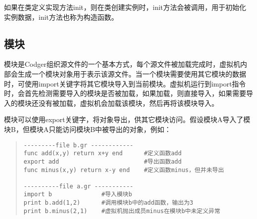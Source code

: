 如果在类定义实现方法init，则在类创建实例时，init方法会被调用，用于初始化实例数据，init方法也称为构造函数。

\subsection{模块} 
模块是Codger组织源文件的一个基本方式，每个源文件被加载完成时，虚拟机内部会生成一个模块对象用于表示该源文件。当一个模块需要使用其它模块的数据时，可使用import关键字将其它模块导入到当前模块。虚拟机运行到import指令时，会首先检测需要导入的模块是否被加载，如果加载，则直接导入，如果需要导入的模块还没有被加载，虚拟机会加载该模块，然后再将该模块导入。

模块可以使用export关键字，将对象导出，供其它模块访问。假设模块A导入了模块B，但模块A只能访问模块B中被导出的对象，例如：
\begin{quote}
\begin{verbatim}
---------file b.gr ------------
func add(x,y) return x+y end      #定义函数add
export add                        #导出函数add
func minus(x,y) return x-y end    #定义函数minus，但并未导出

----------file a.gr -----------
import b              #导入模块b
print b.add(1,2)      #调用模块b中的add函数，输出为3
print b.minus(2,1)    #虚拟机抛出成员minus在模块b中未定义异常

\end{verbatim}
\end{quote}






